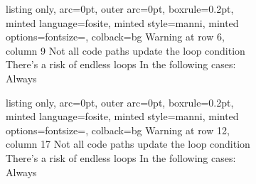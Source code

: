 \clearpage
\begin{figure}[h]
\ContinuedFloat %
\begin{subfigure}{\textwidth}
\begin{tcblisting}{listing only, 
    arc=0pt,
    outer arc=0pt, 
    boxrule=0.2pt,
    minted language=fosite,
    minted style=manni,
    minted options={fontsize=\small},
    colback=bg }
Warning at row 6, column 9
  Not all code paths update the loop condition
  There's a risk of endless loops
  In the following cases:
    Always
\end{tcblisting}
\begin{tcblisting}{listing only, 
    arc=0pt,
    outer arc=0pt, 
    boxrule=0.2pt,
    minted language=fosite,
    minted style=manni,
    minted options={fontsize=\small},
    colback=bg }
Warning at row 12, column 17
  Not all code paths update the loop condition
  There's a risk of endless loops
  In the following cases:
    Always
\end{tcblisting}
\end{subfigure}
\end{figure}

